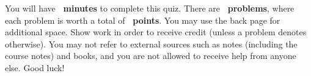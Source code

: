 \begin{tcolorbox}[enhanced,attach boxed title to top center=
	{yshift=-2mm,yshifttext=-1mm},colback=white,colframe=black,colbacktitle=black,title={\textbf{Instructions}}]
	You will have \textbf{\quiztime\ minutes} to complete this quiz. There are \textbf{\quizproblemcount\ problems}, where each problem is worth a total of \textbf{\quizproblemweight\ points}. You may use the back page for additional space. Show work in order to receive credit (unless a problem denotes otherwise). You may not refer to external sources such as notes (including the course notes) and books, and you are not allowed to receive help from anyone else. Good luck!
\end{tcolorbox}